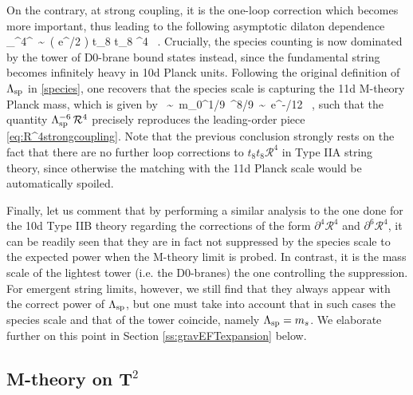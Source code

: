 On the contrary, at strong coupling, it is the one-loop correction which becomes more important, thus leading to the following asymptotic dilaton dependence
%
\beq
{}_{^4}^{}\, \sim\,  \left( e^{\phi/2} \right) t_8 t_8 ^4 \ .
\label{eq:R^4strongcoupling}
\eeq
%
Crucially, the species counting is now dominated by the tower of D0-brane bound states instead, since the fundamental string becomes infinitely heavy in 10d Planck units. Following the original definition of $\Lambda_{\text{sp}}$ in \eqref{species}, one recovers that the species scale is capturing the 11d M-theory Planck mass, which is given by
%
\beq \label{eq:QGscaleandN} 
		\LSP\, \sim\, m_{0}^{1/9}\ \Mpt^{8/9}\, \sim\,  e^{-\phi/12} \Mpt\, ,
\eeq
%
such that the quantity $\Lambda_{\text{sp}}^{-6}\, \mathcal{R}^4$ precisely reproduces the leading-order piece \eqref{eq:R^4strongcoupling}. Note that the previous conclusion strongly rests on the fact that there are no further loop corrections to $t_8 t_8 \mathcal{R}^4$ in Type IIA string theory, since otherwise the matching with the 11d Planck scale would be automatically spoiled. 

Finally, let us comment that by performing a similar analysis to the one done for the 10d Type IIB theory regarding the corrections of the form $\partial^4 \mathcal{R}^4$ and $\partial^6 \mathcal{R}^4$, it can be readily seen that they are in fact not suppressed by the species scale to the expected power when the M-theory limit is probed. In contrast, it is the mass scale of the lightest tower (i.e. the D0-branes) the one controlling the suppression. For emergent string limits, however, we still find that they always appear with the correct power of $\Lambda_{\text{sp}}$, but one must take into account that in such cases the species scale and that of the tower coincide, namely $\Lambda_{\text{sp}} = m_s$. We elaborate further on this point in Section \ref{ss:gravEFTexpansion} below.

\subsection{M-theory on $\mathbf{T}^2$}
\label{ss:MthyT2}

